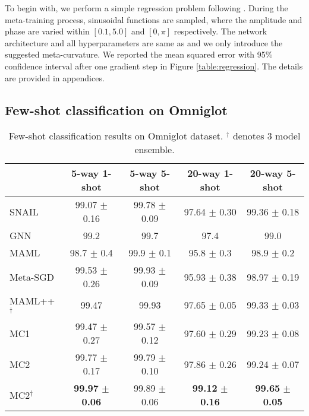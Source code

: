 \documentclass{article}
\begin{document}
To begin with, we perform a simple regression problem following \cite{Finn-icml-2017,Li-arxiv-2017}. During the meta-training process, sinusoidal functions are sampled, where the amplitude and phase are varied within $[0.1,5.0]$ and $[0,\pi]$ respectively. The network architecture and all hyperparameters are same as \cite{Finn-icml-2017} and we only introduce the suggested meta-curvature. We reported the mean squared error with 95\% confidence interval after one gradient step in Figure \ref{table:regression}. The details are provided in appendices.

\subsection{Few-shot classification on Omniglot}
\begin{table}[t]
\caption{Few-shot classification results on Omniglot dataset. $^\dagger$ denotes 3 model ensemble. }
\label{table:omniglot}
\begin{center}
\begin{footnotesize}
\begin{tabular}{lcccc}
\toprule
& 5-way 1-shot & 5-way 5-shot & 20-way 1-shot & 20-way 5-shot \\
\midrule
SNAIL \cite{snail} & 99.07 $\pm$ 0.16 & 99.78 $\pm$ 0.09 & 97.64 $\pm$ 0.30 & 99.36 $\pm$ 0.18 \\
GNN \cite{gnn} & 99.2 & 99.7 & 97.4 & 99.0 \\
\midrule
MAML & 98.7 $\pm$ 0.4 & 99.9 $\pm$ 0.1 & 95.8 $\pm$ 0.3 & 98.9 $\pm$ 0.2 \\
Meta-SGD & 99.53 $\pm$ 0.26 & 99.93 $\pm$ 0.09 & 95.93 $\pm$ 0.38 & 98.97 $\pm$ 0.19 \\
MAML++$^\dagger$ \cite{Antoniou-arxiv-2018} & 99.47  & 99.93 & 97.65 $\pm$ 0.05 & 99.33 $\pm$ 0.03 \\
MC1 & 99.47 $\pm$ 0.27 & 99.57 $\pm$ 0.12 & 97.60 $\pm$ 0.29 & 99.23 $\pm$ 0.08 \\
MC2 & 99.77 $\pm$ 0.17 & 99.79 $\pm$ 0.10 & 97.86 $\pm$ 0.26 & 99.24 $\pm$ 0.07 \\
MC2$^\dagger$ & \textbf{99.97} $\pm$ \textbf{0.06} & 99.89 $\pm$ 0.06 & \textbf{99.12} $\pm$ \textbf{0.16} & \textbf{99.65} $\pm$ \textbf{0.05} \\
\bottomrule
\end{tabular}
\end{footnotesize}
\end{center}
\vskip -0.1in
\end{table}
\end{document}

